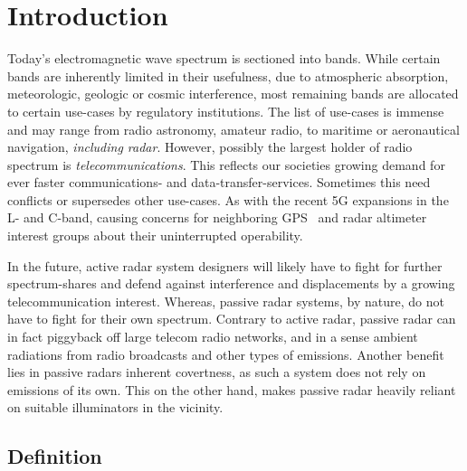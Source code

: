 \chapter{Introduction}\label{chp:introduction}

Today's electromagnetic wave spectrum is sectioned into bands. While certain bands are inherently limited in their usefulness, due to atmospheric absorption, meteorologic, geologic or cosmic interference, most remaining bands are allocated to certain use-cases by regulatory institutions. The list of use-cases is immense and may range from radio astronomy, amateur radio, to maritime or aeronautical navigation, \emph{including radar}. However, possibly the largest holder of radio spectrum is \emph{telecommunications}. This reflects our societies growing demand for ever faster communications- and data-transfer-services. Sometimes this need conflicts or supersedes other use-cases. As with the recent 5G expansions in the L- and C-band, causing concerns for neighboring GPS~\cite{GPS.gov2020} and radar altimeter~\cite{RTCA2020} interest groups about their uninterrupted operability.

In the future, active radar system designers will likely have to fight for further spectrum-shares and defend against interference and displacements by a growing telecommunication interest. Whereas, passive radar systems, by nature, do not have to fight for their own spectrum. Contrary to active radar, passive radar can in fact piggyback off large telecom radio networks, and in a sense  ambient radiations from radio broadcasts and other types of emissions. Another benefit lies in passive radars inherent covertness, as such a system does not rely on emissions of its own. This on the other hand, makes passive radar heavily reliant on suitable illuminators in the vicinity.

\section{Definition}

